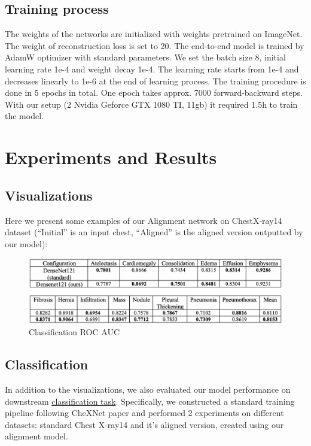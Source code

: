 \documentclass{article}
\begin{document}
\subsection{Training process}
The weights of the networks are initialized with weights pretrained on ImageNet. 
The weight of reconstruction loss is set to 20. The end-to-end model is trained 
by AdamW optimizer with standard parameters. We set the batch size 8, initial 
learning rate 1e-4 and weight decay 1e-4. The learning rate starts from 1e-4 
and decreases linearly to 1e-6 at the end of learning process. The training 
procedure is done in 5 epochs in total. One epoch takes approx. 7000 
forward-backward steps. With our setup (2 Nvidia Geforce GTX 1080 TI, 11gb) it 
required 1.5h to train the model.

\section{Experiments and Results}\label{experiments_and_results}

\subsection{Visualizations}

Here we present some examples of our Alignment network on ChestX-ray14 dataset 
 (``Initial'' is an input chest, ``Aligned'' is the aligned version outputted by our model):

 \begin{figure}[ht]\label{classification}
     \vskip 0.2in
     \begin{center}
     \centerline{\includegraphics[width=\columnwidth * 2]{../images/classification.png}}
     \caption{Classification ROC AUC}
     \end{center}
     \vskip -0.2in
 \end{figure}
 
 \subsection{Classification}
 
 In addition to the visualizations, we also evaluated our model performance 
 on downstream \href{https://paperswithcode.com/sota/multi-label-classification-on-chestx-ray14}{classification task}. 
 Specifically, we constructed a standard training pipeline following CheXNet 
 paper \cite{CheXNet} and performed 2 experiments on different datasets: standard Chest X-ray14 
and it's aligned version, created using our alignment model.
\end{document}
